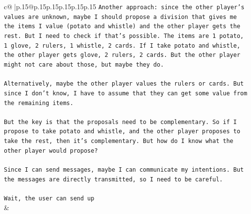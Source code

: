 \documentclass{article}
\begin{document}
{\begin{supertabular}{c@{$\;$}|p{.15\linewidth}@{}p{.15\linewidth}p{.15\linewidth}p{.15\linewidth}p{.15\linewidth}p{.15\linewidth}}
{{{\texttt{Another approach: since the other player's values are unknown, maybe I should propose a division that gives me the items I value (potato and whistle) and the other player gets the rest. But I need to check if that's possible. The items are 1 potato, 1 glove, 2 rulers, 1 whistle, 2 cards. If I take potato and whistle, the other player gets glove, 2 rulers, 2 cards. But the other player might not care about those, but maybe they do. } \\
\\ 
\texttt{Alternatively, maybe the other player values the rulers or cards. But since I don't know, I have to assume that they can get some value from the remaining items. } \\
\\ 
\texttt{But the key is that the proposals need to be complementary. So if I propose to take potato and whistle, and the other player proposes to take the rest, then it's complementary. But how do I know what the other player would propose? } \\
\\ 
\texttt{Since I can send messages, maybe I can communicate my intentions. But the messages are directly transmitted, so I need to be careful. } \\
\\ 
\texttt{Wait, the user can send up} \\
            }
        }
    }
    & \\ \\


\end{supertabular}}
\end{document}
